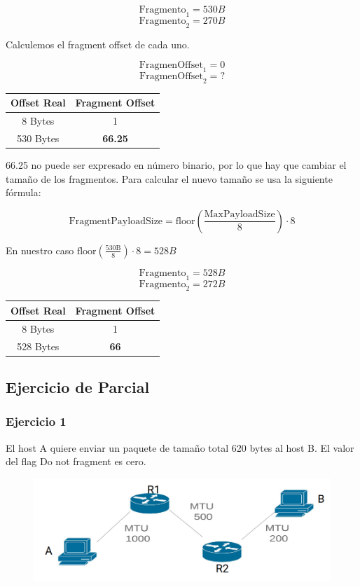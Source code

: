 $$\mathrm{Fragmento}_1 = 530 B$$
$$\mathrm{Fragmento}_2 = 270 B$$

Calculemos el fragment offset de cada uno.

$$ \mathrm{FragmenOffset}_1 = 0 $$
$$ \mathrm{FragmenOffset}_2 =  ? $$

\begin{center}
    \begin{tabular}{c|c}
        Offset Real & Fragment Offset \\
        \hline
        \hline
        8 Bytes & 1 \\
        \hline
        530 Bytes & \textbf{66.25}
    \end{tabular}
\end{center}

66.25 no puede ser expresado en número binario, por lo que hay que cambiar el tamaño de los fragmentos. Para calcular el nuevo tamaño se usa la siguiente fórmula:

$$ \mathrm{FragmentPayloadSize} = \mathrm{floor}(\frac{\mathrm{MaxPayloadSize}}{8}) \cdot 8 $$

En nuestro caso $\mathrm{floor}(\frac{\mathrm{530 B}}{8}) \cdot 8 = 528 B$

$$\mathrm{Fragmento}_1 = 528 B$$
$$\mathrm{Fragmento}_2 = 272 B$$

\begin{center}
    \begin{tabular}{c|c}
        Offset Real & Fragment Offset \\
        \hline
        \hline
        8 Bytes & 1 \\
        \hline
        528 Bytes & \textbf{66}
    \end{tabular}
\end{center}


\subsection{Ejercicio de Parcial}

\subsubsection{Ejercicio 1}
El host A quiere enviar un paquete de tamaño total 620 bytes al host B. El valor del flag Do not fragment es cero.

\begin{figure}[H]
\centering
\includegraphics[width=\textwidth]{imagenes/frag1.png}
\end{figure}

